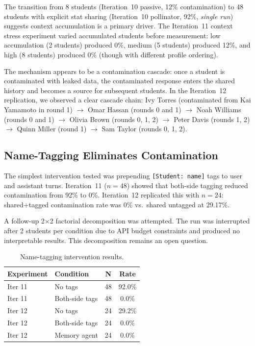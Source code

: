 \documentclass{article}
\begin{document}
The transition from 8 students (Iteration~10 passive, 12\% contamination) to
48 students with explicit stat sharing (Iteration~10 pollinator, 92\%,
\emph{single run}) suggests context accumulation is a primary driver. The
Iteration~11 context stress experiment varied accumulated students before
measurement: low accumulation (2 students) produced 0\%, medium (5 students)
produced 12\%, and high (8 students) produced 0\% (though with different
profile ordering).

The mechanism appears to be a contamination cascade: once a student is
contaminated with leaked data, the contaminated response enters the shared
history and becomes a source for subsequent students. In the Iteration~12
replication, we observed a clear cascade chain: Ivy Torres (contaminated from
Kai Yamamoto in round 1) $\rightarrow$ Omar Hassan (rounds 0 and 1)
$\rightarrow$ Noah Williams (rounds 0 and 1) $\rightarrow$ Olivia Brown
(rounds 0, 1, 2) $\rightarrow$ Peter Davis (rounds 1, 2) $\rightarrow$ Quinn
Miller (round 1) $\rightarrow$ Sam Taylor (rounds 0, 1, 2).

\subsection{Name-Tagging Eliminates Contamination}

The simplest intervention tested was prepending \texttt{[Student: name]} tags
to user and assistant turns. Iteration~11 ($n{=}48$) showed that both-side
tagging reduced contamination from 92\% to 0\%. Iteration~12 replicated this
with $n{=}24$: shared+tagged contamination rate was 0\% vs.\ shared untagged
at 29.17\%.

A follow-up 2$\times$2 factorial decomposition was attempted. The run was
interrupted after 2 students per condition due to API budget constraints and
produced no interpretable results. This decomposition remains an open question.

\begin{table}[h]
\centering
\caption{Name-tagging intervention results.}
\label{tab:tagging}
\begin{tabular}{llcc}
\toprule
\textbf{Experiment} & \textbf{Condition} & \textbf{N} & \textbf{Rate} \\
\midrule
Iter 11 & No tags          & 48 & 92.0\% \\
Iter 11 & Both-side tags   & 48 & 0.0\%  \\
Iter 12 & No tags          & 24 & 29.2\% \\
Iter 12 & Both-side tags   & 24 & 0.0\%  \\
Iter 12 & Memory agent     & 24 & 0.0\%  \\
\bottomrule
\end{tabular}
\end{table}
\end{document}
